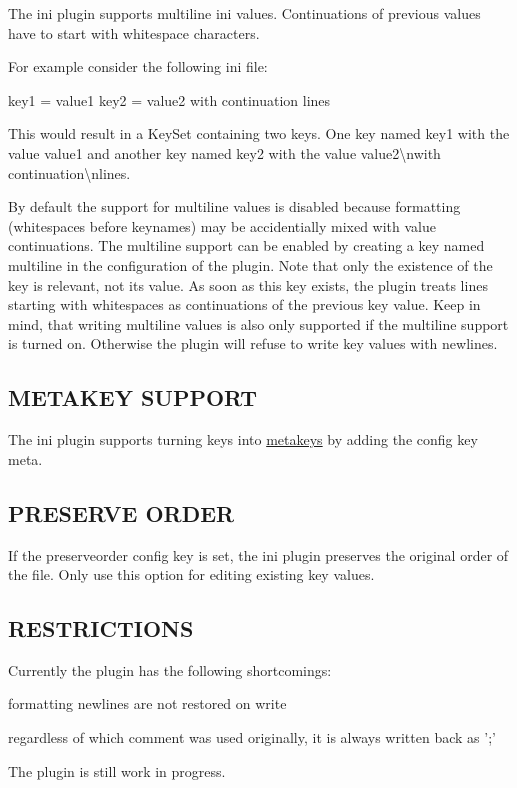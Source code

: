 The ini plugin supports multiline ini values. Continuations of previous values have to start with whitespace characters.

For example consider the following ini file\+: \begin{DoxyVerb}                            key1 = value1
                            key2 = value2
                                    with continuation
                                    lines
\end{DoxyVerb}


This would result in a Key\+Set containing two keys. One key named {\ttfamily key1} with the value {\ttfamily value1} and another key named {\ttfamily key2} with the value {\ttfamily value2\textbackslash{}nwith continuation\textbackslash{}nlines}.

By default the support for multiline values is disabled because formatting (whitespaces before keynames) may be accidentially mixed with value continuations. The multiline support can be enabled by creating a key named {\ttfamily multiline} in the configuration of the plugin. Note that only the existence of the key is relevant, not its value. As soon as this key exists, the plugin treats lines starting with whitespaces as continuations of the previous key value. Keep in mind, that writing multiline values is also only supported if the multiline support is turned on. Otherwise the plugin will refuse to write key values with newlines.

\subsection*{M\+E\+T\+A\+K\+E\+Y S\+U\+P\+P\+O\+R\+T}

The ini plugin supports turning keys into \hyperlink{md_doc_help_elektra-meta-data_doc_help_elektra-meta-data_md}{metakeys} by adding the config key {\ttfamily meta}.

\subsection*{P\+R\+E\+S\+E\+R\+V\+E O\+R\+D\+E\+R}

If the {\ttfamily preserveorder} config key is set, the ini plugin preserves the original order of the file. Only use this option for editing existing key values.

\subsection*{R\+E\+S\+T\+R\+I\+C\+T\+I\+O\+N\+S}

Currently the plugin has the following shortcomings\+:


\begin{DoxyItemize}
\item formatting newlines are not restored on write
\item regardless of which comment was used originally, it is always written back as ';'
\end{DoxyItemize}

The plugin is still work in progress. 